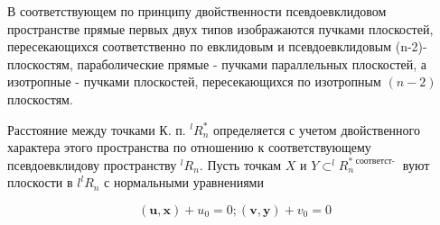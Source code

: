\documentclass[10pt]{article}
\begin{document}
В соответствующем по принципу двойственности псевдоевклидовом пространстве прямые первых двух типов изображаются пучками плоскостей, пересекающихся соответственно по евклидовым и псевдоевклидовым (n-2)-плоскостям, параболические прямые - пучками параллельных плоскостей, а изотропные - пучками плоскостей, пересекающихся по изотропным $(n-2)$ плоскостям.



Расстояние между точками К. п. ${ }^{l} R_{n}^{*}$ определяется с учетом двойственного характера этого пространства по отношению к соответствующему псевдоевклидову пространству ${ }^{l} R_{n}$. Пусть точкам $X$ и $Y \subset^{l} R_{n}^{* \text { соответст- }}$ вуют плоскости в $l^{l} R_{n}$ с нормальными уравнениями



\[

(\boldsymbol{u}, \boldsymbol{x})+u_{0}=0 ;(\boldsymbol{v}, \boldsymbol{y})+v_{0}=0

\]
\end{document}
